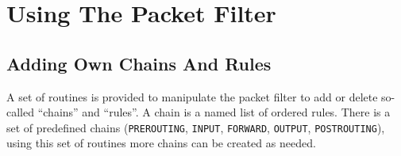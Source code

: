 
\providecommand{\fwaction}[1]{{\small\textsf{#1}}}
\providecommand{\fwchain}[1]{\texttt{#1}}
\providecommand{\fwtable}[1]{\textsc{#1}}
\providecommand{\fwmatch}[1]{\texttt{#1}}
\providecommand{\fwpktstate}[1]{\texttt{#1}}
\providecommand{\fwloglevel}[1]{\texttt{#1}}

\section{Using The Packet Filter}
\subsection{Adding Own Chains And Rules}

A set of routines is provided to manipulate the packet filter to add or delete
so-called ``chains'' and ``rules''. A chain is a named list of ordered rules.
There is a set of predefined chains (\fwchain{PREROUTING}, \fwchain{INPUT},
\fwchain{FORWARD}, \fwchain{OUTPUT}, \fwchain{POSTROUTING}), using this set of
routines more chains can be created as needed.

